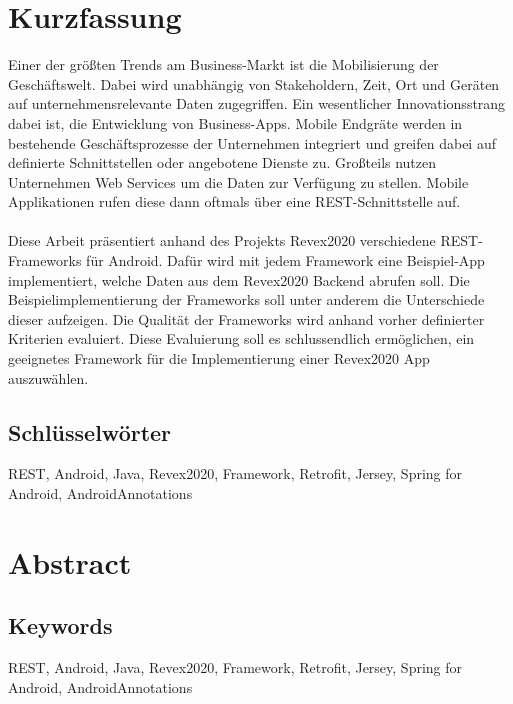
\cleardoublepage
{}


\chapter*{Kurzfassung}
Einer der größten Trends am Business-Markt ist die Mobilisierung der Geschäftswelt. Dabei wird unabhängig von Stakeholdern, Zeit, Ort und Geräten auf unternehmensrelevante Daten zugegriffen. Ein wesentlicher Innovationsstrang dabei ist, die Entwicklung von Business-Apps. Mobile Endgräte werden in bestehende Geschäftsprozesse der Unternehmen integriert und greifen dabei auf definierte Schnittstellen oder angebotene Dienste zu. Großteils nutzen Unternehmen Web Services um die Daten zur Verfügung zu stellen. Mobile Applikationen rufen diese dann oftmals über eine REST-Schnittstelle auf.
\\\\
Diese Arbeit präsentiert anhand des Projekts Revex2020 verschiedene REST-Frameworks für Android. Dafür wird mit jedem Framework eine Beispiel-App implementiert, welche Daten aus dem Revex2020 Backend abrufen soll. Die Beispielimplementierung der Frameworks soll unter anderem die Unterschiede dieser aufzeigen. Die Qualität der Frameworks wird anhand vorher definierter Kriterien evaluiert. Diese Evaluierung soll es schlussendlich ermöglichen, ein geeignetes Framework für die Implementierung einer Revex2020 App auszuwählen.

\section*{Schl\"usselw\"orter}
REST, Android, Java, Revex2020, Framework, Retrofit, Jersey, Spring for Android, AndroidAnnotations


\chapter*{Abstract}

\section*{Keywords}
REST, Android, Java, Revex2020, Framework, Retrofit, Jersey, Spring for Android, AndroidAnnotations

